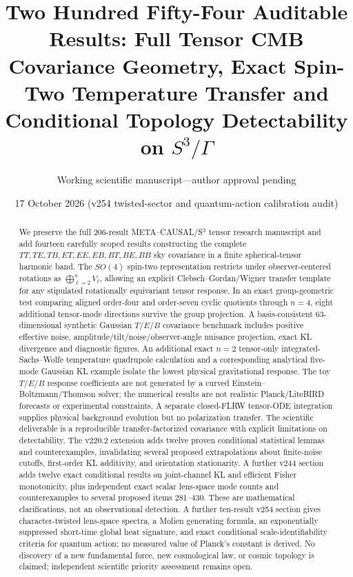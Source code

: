 \documentclass[aps,prd,onecolumn,notitlepage,groupedaddress,11pt]{revtex4-2}
\begin{document}
\title{Two Hundred Fifty-Four Auditable Results: Full Tensor CMB Covariance Geometry, Exact Spin-Two Temperature Transfer and Conditional Topology Detectability on $S^3/\Gamma$}
\author{Working scientific manuscript---author approval pending}\noaffiliation
\date{17 October 2026 (v254 twisted-sector and quantum-action calibration audit)}
\begin{abstract}
We preserve the full 206-result META--CAUSAL/S$^3$ tensor research manuscript and add fourteen carefully scoped results constructing the complete $TT,TE,TB,ET,EE,EB,BT,BE,BB$ sky covariance in a finite spherical-tensor harmonic band. The $SO(4)$ spin-two representation restricts under observer-centered rotations as $\bigoplus_{\ell=2}^n V_\ell$, allowing an explicit Clebsch--Gordan/Wigner transfer template for any stipulated rotationally equivariant tensor response. In an exact group-geometric test comparing aligned order-four and order-seven cyclic quotients through $n=4$, eight additional tensor-mode directions survive the group projection. A basis-consistent 63-dimensional synthetic Gaussian $T/E/B$ covariance benchmark includes positive effective noise, amplitude/tilt/noise/observer-angle nuisance projection, exact KL divergence and diagnostic figures. An additional exact $n=2$ tensor-only integrated-Sachs--Wolfe temperature quadrupole calculation and a corresponding analytical five-mode Gaussian KL example isolate the lowest physical gravitational response. The toy $T/E/B$ response coefficients are not generated by a curved Einstein--Boltzmann/Thomson solver; the numerical results are not realistic Planck/LiteBIRD forecasts or experimental constraints. A separate closed-FLRW tensor-ODE integration supplies physical background evolution but no polarization transfer. The scientific deliverable is a reproducible transfer-factorized covariance with explicit limitations on detectability. The v220.2 extension adds twelve proven conditional statistical lemmas and counterexamples, invalidating several proposed extrapolations about finite-noise cutoffs, first-order KL additivity, and orientation stationarity. A further v244 section adds twelve exact conditional results on joint-channel KL and efficient Fisher monotonicity, plus independent exact scalar lens-space mode counts and counterexamples to several proposed items 281--430. These are mathematical clarifications, not an observational detection. A further ten-result v254 section gives character-twisted lens-space spectra, a Molien generating formula, an exponentially suppressed short-time global heat signature, and exact conditional scale-identifiability criteria for quantum action; no measured value of Planck's constant is derived. No discovery of a new fundamental force, new cosmological law, or cosmic topology is claimed; independent scientific priority assessment remains open.
\end{abstract}
\maketitle
\end{document}
